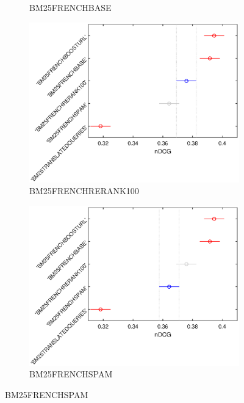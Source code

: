 \begin{figure}[p]
\begin{subfigure}[b]{0.49\textwidth}
         \caption{BM25FRENCHBASE}
         \label{fig:lthsd2}
     \end{subfigure}
     \hfill
     \begin{subfigure}[b]{0.49\textwidth}
         \centering
         \includegraphics[width=\textwidth]{figure/longterm/tukeyhsd-3.eps}
         \caption{BM25FRENCHRERANK100}
         \label{fig:lthsd3}
     \end{subfigure}
     \begin{subfigure}[b]{0.49\textwidth}
         \centering
         \includegraphics[width=\textwidth]{figure/longterm/tukeyhsd-4.eps}
         \caption{BM25FRENCHSPAM}
         \label{fig:lthsd4}
     \end{subfigure}

\end{figure}
